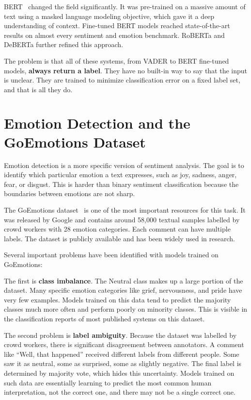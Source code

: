 BERT~\cite{bert} changed the field significantly. It was pre-trained on a massive amount of text using
a masked language modeling objective, which gave it a deep understanding of context.
Fine-tuned BERT models reached state-of-the-art results on almost every sentiment and emotion
benchmark. RoBERTa and DeBERTa further refined this approach.

The problem is that all of these systems, from VADER to BERT fine-tuned models, \textbf{always
return a label}. They have no built-in way to say that the input is unclear. They are trained
to minimize classification error on a fixed label set, and that is all they do.

\section{Emotion Detection and the GoEmotions Dataset}

Emotion detection is a more specific version of sentiment analysis. The goal is to identify
which particular emotion a text expresses, such as joy, sadness, anger, fear, or disgust. This
is harder than binary sentiment classification because the boundaries between emotions are not
sharp.

The GoEmotions dataset~\cite{goemotions} is one of the most important resources for this task. It was
released by Google and contains around 58,000 textual samples labelled by crowd workers
with 28 emotion categories. Each comment can have multiple labels. The dataset is publicly
available and has been widely used in research.

Several important problems have been identified with models trained on GoEmotions:

The first is \textbf{class imbalance}. The Neutral class makes up a large portion of the dataset.
Many specific emotion categories like grief, nervousness, and pride have very few examples.
Models trained on this data tend to predict the majority classes much more often and perform
poorly on minority classes. This is visible in the classification reports of most published systems
on this dataset.

The second problem is \textbf{label ambiguity}. Because the dataset was labelled by crowd
workers, there is significant disagreement between annotators. A comment like ``Well, that
happened'' received different labels from different people. Some saw it as neutral, some as
surprised, some as slightly negative. The final label is determined by majority vote, which hides
this uncertainty. Models trained on such data are essentially learning to predict the most common
human interpretation, not the correct one, and there may not be a single correct one.

